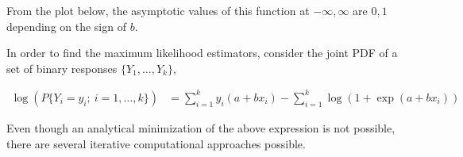 From the plot below, the asymptotic values of this function at $ -\infty, \infty $ are $ 0, 1 $ depending on the sign of $ b $.


\begin{figure}[H]
	\centering
\end{figure}


In order to find the maximum likelihood estimators, consider the joint PDF of a set of binary responses $ \{Y_1, \dots, Y_k\} $,

\begin{align}
	\log(P\{Y_i = y_i;\ i = 1,\dots,k\}) &= \sum\limits_{i = 1}^{k} y_i (a + bx_i) - \sum\limits_{i = 1}^{k} \log(1 + \exp(a +b x_i))
\end{align}

Even though an analytical minimization of the above expression is not possible, there are several iterative computational approaches possible.


